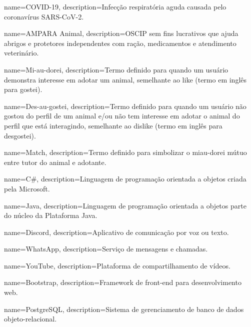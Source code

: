 


 {
    name=COVID-19,
    description={Infecção respiratória aguda causada pelo coronavírus SARS-CoV-2.}
}

 {
    name=AMPARA Animal,
    description={\ac{OSCIP} sem fins lucrativos que ajuda abrigos e protetores independentes com ração, medicamentos e atendimento veterinário.}
}

 {
    name=Mi-au-dorei,
    description={Termo definido para quando um usuário demonstra interesse em adotar um animal, semelhante ao like (termo em inglês para gostei).}
}

 {
    name=Des-au-gostei,
    description={Termo definido para quando um usuário não gostou do perfil de um animal e/ou não tem interesse em adotar o animal do perfil que está interagindo, semelhante ao dislike (termo em inglês para desgostei).}
}

 {
    name=Match,
    description={Termo definido para simbolizar o miau-dorei mútuo entre tutor do animal e adotante.}
}

 {
    name=C\#,
    description={Linguagem de programação orientada a objetos criada pela Microsoft.}
}

 {
    name=Java,
    description={Linguagem de programação orientada a objetos parte do núcleo da Plataforma Java.}
}

 {
    name=Discord,
    description={Aplicativo de comunicação por voz ou texto.}
}

 {
    name=WhatsApp,
    description={Serviço de mensagens e chamadas.}
}

 {
    name=YouTube,
    description={Plataforma de compartilhamento de vídeos.}
}

 {
    name=Bootstrap,
    description={Framework de front-end para desenvolvimento web.}
}

 {
    name=PostgreSQL,
    description={Sistema de gerenciamento de banco de dados objeto-relacional.}
}

